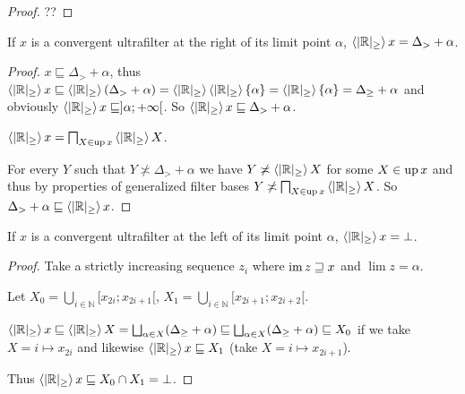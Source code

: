 \begin{proof}
??
\end{proof}

\begin{lem}
  If $x$ is a convergent ultrafilter at the right of its limit point $\alpha$,
  $\left\langle  | \mathbb{R} |_{\geq} \right\rangle x = \Delta_{>} + \alpha$.
\end{lem}

\begin{proof}
  $x \sqsubseteq \Delta_{>} + \alpha$, thus $\left\langle  | \mathbb{R} |_{\geq}
  \right\rangle x \sqsubseteq \left\langle  | \mathbb{R} |_{\geq} \right\rangle (\Delta_{>} +
  \alpha) = \left\langle  | \mathbb{R} |_{\geq} \right\rangle \left\langle  | \mathbb{R}
  |_{\geq} \right\rangle \{ \alpha \} = \left\langle  | \mathbb{R} |_{\geq} \right\rangle \{
  \alpha \} = \Delta_{\geq} + \alpha$ and obviously $\left\langle  | \mathbb{R}
  |_{\geq} \right\rangle x \sqsubseteq] \alpha ; + \infty [$. So $\left\langle  |
  \mathbb{R} |_{\geq} \right\rangle x \sqsubseteq \Delta_{>} + \alpha$.
  
  $\left\langle  | \mathbb{R} |_{\geq} \right\rangle x = \bigsqcap_{X \in \operatorname{up} x}
  \left\langle  | \mathbb{R} |_{\geq} \right\rangle X$.
  
  For every $Y$ such that $Y \nasymp \Delta_{>} + \alpha$ we have $Y \not\asymp
  \left\langle  | \mathbb{R} |_{\geq} \right\rangle X$ for some
  $X \in \operatorname{up} x$ and
  thus by properties of generalized filter bases $Y \not\asymp \bigsqcap_{X \in
  \operatorname{up} x} \left\langle  | \mathbb{R} |_{\geq} \right\rangle X$. So $\Delta_{>} +
  \alpha \sqsubseteq \left\langle  | \mathbb{R} |_{\geq} \right\rangle x$.
\end{proof}

\begin{lem}
  If $x$ is a convergent ultrafilter at the left of its
  limit point $\alpha$, $\left\langle  | \mathbb{R} |_{\geq} \right\rangle x = \bot$.
\end{lem}

\begin{proof}
  Take a strictly increasing sequence $z_i$ where $\operatorname{im} z \sqsupseteq x$
  and $\lim z = \alpha$.
  
  Let $X_0 = \bigcup_{i \in \mathbb{N}} [x_{2 i} ; x_{2 i + 1} [$, $X_1 =
  \bigcup_{i \in \mathbb{N}} [x_{2 i + 1} ; x_{2 i + 2} [$.
  
  $\supfun{ | \mathbb{R} |_{\geq} } x \sqsubseteq \supfun{ | \mathbb{R}
  |_{\geq} } X = \bigsqcup_{\alpha \in X} (\Delta_{\geq} + \alpha)
  \sqsubseteq \bigsqcup_{\alpha \in X} (\Delta_{\geq} + \alpha) \sqsubseteq
  X_0$ if we take $X = i \mapsto x_{2 i}$ and likewise $\left\langle  | \mathbb{R}
  |_{\geq} \right\rangle x \sqsubseteq X_1$ (take $X = i \mapsto x_{2 i + 1}$).
  
  Thus $\left\langle  | \mathbb{R} |_{\geq} \right\rangle x \sqsubseteq X_0 \cap X_1 =
  \bot$.
\end{proof}

